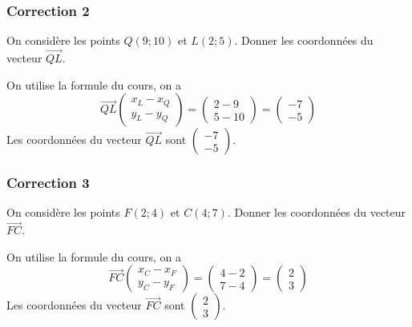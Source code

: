 \documentclass[15pt, mathserif]{beamer}
\begin{document}
\begin{frame}
\vspace{-10mm}
	\frametitle{Correction 2}
On considère les points $Q(9;10)$ et $L(2;5)$. Donner les coordonnées du vecteur $ \overrightarrow{QL}$. 
 
 On utilise la formule du cours, on a 
 $$\overrightarrow{ QL}\begin{pmatrix} x_{L}-x_{Q} \\ y_{L}-y_{Q} \end{pmatrix}=\begin{pmatrix} 2-9\\ 5-10\end{pmatrix}=\begin{pmatrix} -7\\ -5\end{pmatrix}$$ Les coordonnées du vecteur $\overrightarrow{QL}$ sont $\begin{pmatrix} -7\\ -5\end{pmatrix}$.\end{frame}


\begin{frame}
\vspace{-10mm}
	\frametitle{Correction 3}
On considère les points $F(2;4)$ et $C(4;7)$. Donner les coordonnées du vecteur $ \overrightarrow{FC}$. 
 
 On utilise la formule du cours, on a 
 $$\overrightarrow{ FC}\begin{pmatrix} x_{C}-x_{F} \\ y_{C}-y_{F} \end{pmatrix}=\begin{pmatrix} 4-2\\ 7-4\end{pmatrix}=\begin{pmatrix} 2\\ 3\end{pmatrix}$$ Les coordonnées du vecteur $\overrightarrow{FC}$ sont $\begin{pmatrix} 2\\ 3\end{pmatrix}$.\end{frame}
\end{document}
